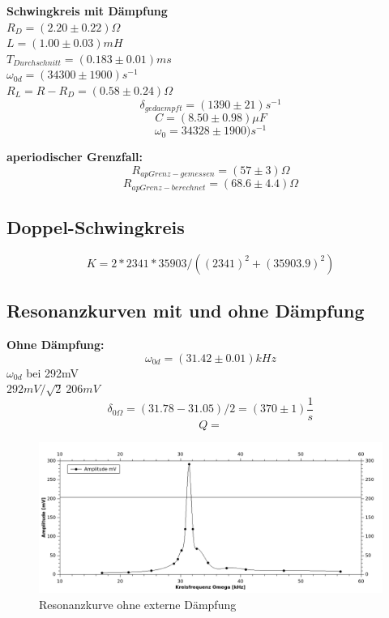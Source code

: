 \documentclass[12pt,a4paper]{article}
\begin{document}
\begin{multicols}{2}


\noindent \textbf{Schwingkreis mit Dämpfung}\\

\noindent $R_D = (2.20\pm 0.22)\Omega$\\
$L=(1.00 \pm 0.03)mH$\\
$T_{Durchschnitt}%
= (0.183  \pm 0.01) ms$\\
$\omega_{0d} = (34300 \pm 1900)s^{-1}$\\
$R_L = R-R_D = (0.58 \pm 0.24)\Omega$ 
$$\delta_{gedaempft} = (1390 \pm 21)s^{-1}$$
$$C = (8.50 \pm 0.98)\mu F$$
$$\omega_{0} = 34328 \pm 1900)s^{-1}$$


\noindent \textbf{aperiodischer Grenzfall:}
$$R_{apGrenz-gemessen} = (57\pm 3)\Omega$$
$$R_{apGrenz-berechnet}=(68.6 \pm 4.4)\Omega$$

\subsection{Doppel-Schwingkreis}
$$K = 2*2341*35903 /((2341)^2+(35903.9)^2)$$

\subsection{Resonanzkurven mit und ohne Dämpfung}
\textbf{Ohne Dämpfung:}\\
$$\omega_{0d} = (31.42 \pm 0.01) kHz$$
$\omega_{0d}$ bei 292mV\\
$292mV / \sqrt{2} ~ 206mV$\\
$$\delta_{0 \Omega} = (31.78 - 31.05)/2 = (370 \pm 1)  \frac{1}{s}$$
$$Q = $$ %

\end{multicols}
\begin{figure}[H]
	\centering
	\includegraphics[scale=1.2]{./figure/resonanz_ohne_ext_daempf.png}
	\caption{Resonanzkurve ohne externe Dämpfung}
	\label{fig:resonanz_ohne}
\end{figure}
\end{document}
